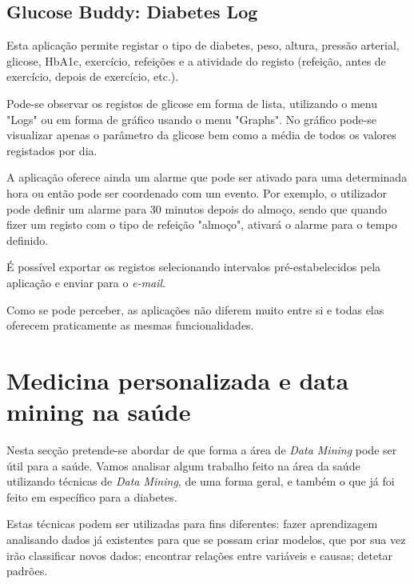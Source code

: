 \subsection{Glucose Buddy: Diabetes Log}

Esta aplicação permite registar o tipo de diabetes, peso, altura, pressão arterial, glicose, HbA1c, exercício, refeições e a atividade do registo (refeição, antes de exercício, depois de exercício, etc.).

Pode-se observar os registos de glicose em forma de lista, utilizando o menu "Logs" ou em forma de gráfico usando o menu "Graphs". No gráfico pode-se visualizar apenas o parâmetro da glicose bem como a média de todos os valores registados por dia.

A aplicação oferece ainda um alarme que pode ser ativado para uma determinada hora ou então pode ser coordenado com um evento. Por exemplo, o utilizador pode definir um alarme para 30 minutos depois do almoço, sendo que quando fizer um registo com o tipo de refeição "almoço", ativará o alarme para o tempo definido. 

É possível exportar os registos selecionando intervalos pré-estabelecidos pela aplicação e enviar para o \textit{e-mail}.\newline





Como se pode perceber, as aplicações não diferem muito entre si e todas elas oferecem praticamente as mesmas funcionalidades. 


\section{Medicina personalizada e data mining na saúde}


Nesta secção pretende-se abordar de que forma a área de \textit{Data Mining} pode ser útil para a saúde. Vamos analisar algum trabalho feito na área da saúde utilizando técnicas de \textit{Data Mining}, de uma forma geral, e também o que já foi feito em específico para a diabetes. 

Estas técnicas podem ser utilizadas para fins diferentes: fazer aprendizagem analisando dados já existentes para que se possam criar modelos, que por sua vez irão classificar novos dados; encontrar relações entre variáveis e causas; detetar padrões.

